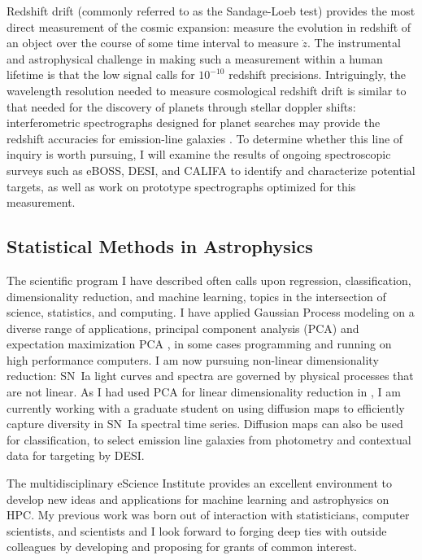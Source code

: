 \documentclass{article}
\begin{document}
Redshift drift (commonly referred to as the Sandage-Loeb test) provides the most direct  measurement
of the cosmic expansion: measure the evolution in redshift of an object over the course of some time interval
to measure $\dot{z}$.
The instrumental
and astrophysical challenge
in making such a measurement within a human lifetime
is that the low signal calls for $10^{-10}$ redshift precisions.  Intriguingly, the wavelength resolution needed to measure
cosmological redshift drift is similar to that needed for the discovery of planets through stellar doppler shifts:
interferometric spectrographs designed for planet searches may provide the redshift accuracies for emission-line galaxies
\cite{drift}.
To determine
whether this line of inquiry is worth pursuing,
I will examine the results of ongoing spectroscopic surveys such as eBOSS, DESI, and CALIFA to identify and characterize
potential targets, as well as work on prototype spectrographs optimized for this measurement.

\subsection{Statistical Methods in Astrophysics}
The scientific program I have described often calls upon regression, classification, dimensionality reduction,
and machine learning, topics in the intersection of science, statistics, and computing.  I have applied Gaussian Process modeling
on a diverse range of applications, principal component
analysis (PCA) and expectation maximization PCA \cite{2012PhRvD..85l3530S,2013ApJ...766...84K,
2013PhRvD..87l3512H}, in some cases programming and running on high performance computers.
I am now pursuing non-linear dimensionality reduction: SN~Ia light curves and spectra
are governed by physical processes that are not linear.  As I had used PCA for linear
dimensionality reduction in  \cite{2013ApJ...766...84K}, I am currently working with a graduate student on
using diffusion maps to efficiently capture diversity in SN~Ia spectral time series.  Diffusion maps can also
be used for classification, to select emission line galaxies from photometry and contextual data for targeting by DESI.

The multidisciplinary eScience Institute provides an excellent environment to develop new ideas and applications
for machine learning and astrophysics on HPC.
My previous work was born out of interaction with statisticians, computer scientists,
and scientists and I look forward to forging deep ties with outside colleagues by developing and proposing
for grants of common interest.
\end{document}
